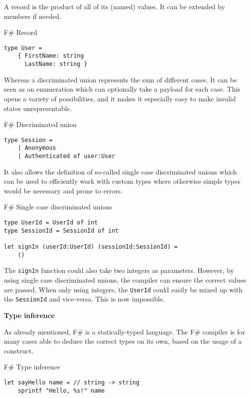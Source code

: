 A record is the product of all of its (named) values. It can be extended by members if needed.

\begin{listing}[H]
\caption{F\# Record}
\begin{verbatim}
type User = 
    { FirstName: string
      LastName: string }
\end{verbatim}
\end{listing}

Whereas a discriminated union represents the sum of different cases. It can be seen as an enumeration which can optionally take a payload for each case. This opens a variety of possibilities, and it makes it especially easy to make invalid states unrepresentable.

\begin{listing}[H]
\caption{F\# Discriminated union}
\begin{verbatim}
type Session =
    | Anonymous
    | Authenticated of user:User
\end{verbatim}
\end{listing}

It also allows the definition of so-called single case discriminated unions which can be used to efficiently work with custom types where otherwise simple types would be necessary and prone to errors.

\begin{listing}[H]
\caption{F\# Single case discriminated unions}
\begin{verbatim}
type UserId = UserId of int
type SessionId = SessionId of int

let signIn (userId:UserId) (sessionId:SessionId) =
    ()
\end{verbatim}
\end{listing}

The \texttt{signIn} function could also take two integers as parameters. However, by using single case discriminated unions, the compiler can ensure the correct values are passed. When only using integers, the \texttt{UserId} could easily be mixed up with the \texttt{SessionId} and vice-versa. This is now impossible.

\textbf{Type inference}

As already mentioned, F\# is a statically-typed language. The F\# compiler is for many cases able to deduce the correct types on its own, based on the usage of a construct.

\begin{listing}[H]
\caption{F\# Type inference}
\begin{verbatim}
let sayHello name = // string -> string
    sprintf "Hello, %s!" name
\end{verbatim}
\end{listing}

